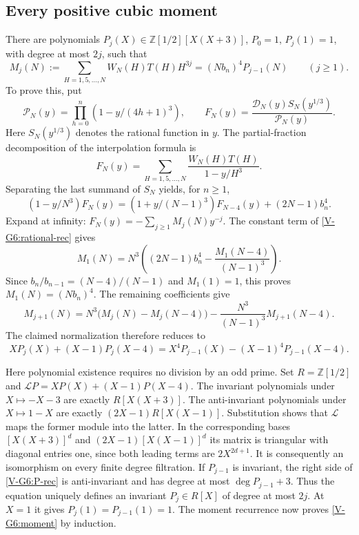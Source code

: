 \documentclass[11pt,letterpaper]{article}
\numberwithin{equation}{section}
\begin{document}
\subsection{Every positive cubic moment}
There are polynomials $P_j(X)\in\mathbb Z[1/2][X(X+3)]$,
$P_0=1$, $P_j(1)=1$, with degree at most $2j$, such that
\begin{equation}\label{V-G6:moment}
 M_j(N):=\sum_{H=1,5,\ldots,N}W_N(H)T(H)H^{3j}
 =(Nb_n)^4P_{j-1}(N)\qquad(j\ge1).
\end{equation}
To prove this, put
\[
 \mathcal P_N(y)=\prod_{h=0}^{n}(1-y/(4h+1)^3),\qquad
 F_N(y)=\frac{\mathcal D_N(y)S_N(y^{1/3})}{\mathcal P_N(y)}.
\]
Here $S_N(y^{1/3})$ denotes the rational function in $y$.
The partial-fraction decomposition of the interpolation formula is
\[
 F_N(y)=\sum_{H=1,5,\ldots,N}\frac{W_N(H)T(H)}{1-y/H^3}.
\]
Separating the last summand of $S_N$ yields, for $n\ge1$,
\begin{equation}\label{V-G6:rational-rec}
 (1-y/N^3)F_N(y)
 =(1+y/(N-1)^3)F_{N-4}(y)+(2N-1)b_n^4.
\end{equation}
Expand at infinity: $F_N(y)=-\sum_{j\ge1}M_j(N)y^{-j}$.
The constant term of \eqref{V-G6:rational-rec} gives
\[
 M_1(N)=N^3\left((2N-1)b_n^4-
                    \frac{M_1(N-4)}{(N-1)^3}\right).
\]
Since $b_n/b_{n-1}=(N-4)/(N-1)$ and $M_1(1)=1$, this proves
$M_1(N)=(Nb_n)^4$. The remaining coefficients give
\[
 M_{j+1}(N)=N^3\bigl(M_j(N)-M_j(N-4)\bigr)
             -\frac{N^3}{(N-1)^3}M_{j+1}(N-4).
\]
The claimed normalization therefore reduces to
\begin{equation}\label{V-G6:P-rec}
 XP_j(X)+(X-1)P_j(X-4)
 =X^4P_{j-1}(X)-(X-1)^4P_{j-1}(X-4).
\end{equation}

Here polynomial existence requires no division by an odd prime.
Set $R=\mathbb Z[1/2]$ and
$\mathcal LP=XP(X)+(X-1)P(X-4)$.
The invariant polynomials under $X\mapsto-X-3$ are exactly
$R[X(X+3)]$. The anti-invariant polynomials under $X\mapsto1-X$
are exactly $(2X-1)R[X(X-1)]$.
Substitution shows that $\mathcal L$ maps the former module into
the latter. In the corresponding bases
$[X(X+3)]^d$ and $(2X-1)[X(X-1)]^d$ its matrix is triangular with
diagonal entries one, since both leading terms are $2X^{2d+1}$.
It is consequently an isomorphism on every finite degree filtration.
If $P_{j-1}$ is invariant, the right side of \eqref{V-G6:P-rec} is
anti-invariant and has degree at most $\deg P_{j-1}+3$.
Thus the equation uniquely defines an invariant $P_j\in R[X]$
of degree at most $2j$. At $X=1$ it gives $P_j(1)=P_{j-1}(1)=1$.
The moment recurrence now proves \eqref{V-G6:moment} by induction.
\end{document}
